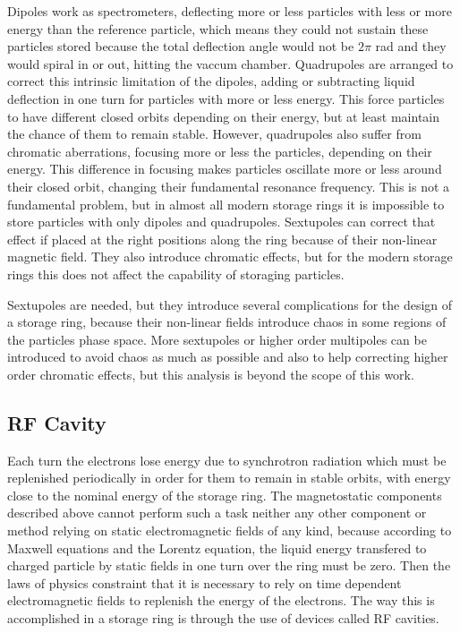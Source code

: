     Dipoles work as spectrometers, deflecting more or less particles with less or more energy than the reference particle, which means they could not sustain these particles stored because the total deflection angle would not be $2\pi$ rad and they would spiral in or out, hitting the vaccum chamber. Quadrupoles are arranged to correct this intrinsic limitation of the dipoles, adding or subtracting liquid deflection in one turn for particles with more or less energy. This force particles to have different closed orbits depending on their energy, but at least maintain the chance of them to remain stable. However, quadrupoles also suffer from chromatic aberrations, focusing more or less the particles, depending on their energy. This difference in focusing makes particles oscillate more or less around their closed orbit, changing their fundamental resonance frequency. This is not a fundamental problem, but in almost all modern storage rings it is impossible to store particles with only dipoles and quadrupoles. Sextupoles can correct that effect if placed at the right positions along the ring because of their non-linear magnetic field. They also introduce chromatic effects, but for the modern storage rings this does not affect the capability of storaging particles.

    Sextupoles are needed, but they introduce several complications for the design of a storage ring, because their non-linear fields introduce chaos in some regions of the particles phase space. More sextupoles or higher order multipoles can be introduced to avoid chaos as much as possible and also to help correcting higher order chromatic effects, but this analysis is beyond the scope of this work.

\subsection{RF Cavity}

    Each turn the electrons lose energy due to synchrotron radiation which must be replenished periodically in order for them to remain in stable orbits, with energy close to the nominal energy of the storage ring. The magnetostatic components described above cannot perform such a task neither any other component or method relying on static electromagnetic fields of any kind, because according to Maxwell equations and the Lorentz equation, the liquid energy transfered to charged particle by static fields in one turn over the ring must be zero. Then the laws of physics constraint that it is necessary to rely on time dependent electromagnetic fields to replenish the energy of the electrons. The way this is accomplished in a storage ring is through the use of devices called RF cavities.

